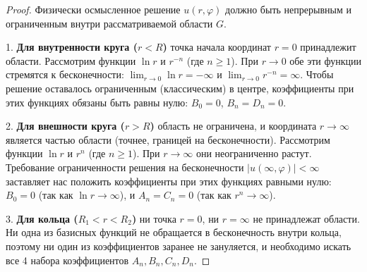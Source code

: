 \documentclass[a4paper,10pt]{article}
\begin{document}
\begin{proof}
Физически осмысленное решение $u(r, \varphi)$ должно быть непрерывным и ограниченным внутри рассматриваемой области $G$.

1. \textbf{Для внутренности круга ($r < R$)} точка начала координат $r=0$ принадлежит области. 
Рассмотрим функции $\ln r$ и $r^{-n}$ (где $n \ge 1$). При $r \to 0$ обе эти функции стремятся к бесконечности: $\lim_{r \to 0} \ln r = -\infty$ и $\lim_{r \to 0} r^{-n} = \infty$. Чтобы решение оставалось ограниченным (классическим) в центре, коэффициенты при этих функциях обязаны быть равны нулю: $B_0 = 0$, $B_n = D_n = 0$.

2. \textbf{Для внешности круга ($r > R$)} область не ограничена, и координата $r \to \infty$ является частью области (точнее, границей на бесконечности). 
Рассмотрим функции $\ln r$ и $r^n$ (где $n \ge 1$). При $r \to \infty$ они неограниченно растут. Требование ограниченности решения на бесконечности $|u(\infty, \varphi)| < \infty$ заставляет нас положить коэффициенты при этих функциях равными нулю: $B_0 = 0$ (так как $\ln r \to \infty$), и $A_n = C_n = 0$ (так как $r^n \to \infty$). 

3. \textbf{Для кольца ($R_1 < r < R_2$)} ни точка $r=0$, ни $r=\infty$ не принадлежат области. Ни одна из базисных функций не обращается в бесконечность внутри кольца, поэтому ни один из коэффициентов заранее не зануляется, и необходимо искать все 4 набора коэффициентов $A_n, B_n, C_n, D_n$.
\end{proof}
\end{document}
